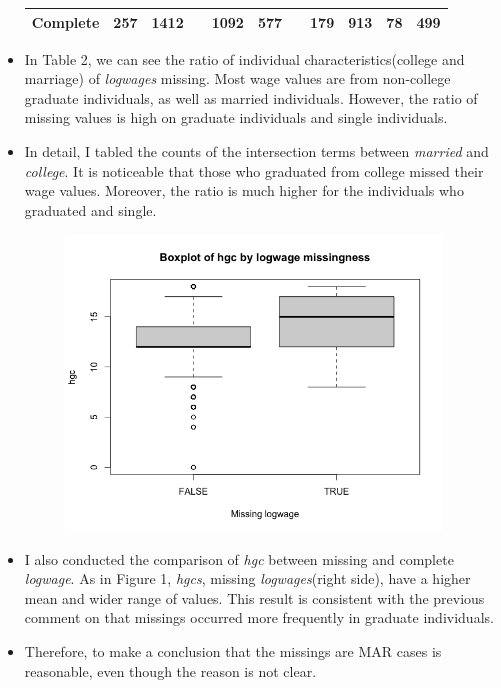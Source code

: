 \documentclass{article}
\begin{document}
\begin{itemize}
\begin{table}[h]
\begin{tabular}[t]{ccccccccccc}
				Complete & 257 & 1412 && 1092 & 577 &&179&913&78&499 \\\bottomrule
			\end{tabular}
		\end{table}
		\item In Table 2, we can see the ratio of individual characteristics(college and marriage) of \textit{logwages} missing. Most wage values are from non-college graduate individuals, as well as married individuals. However, the ratio of missing values is high on graduate individuals and single individuals.
		\item In detail, I tabled the counts of the intersection terms between \textit{married} and \textit{college}. It is noticeable that those who graduated from college missed their wage values. Moreover, the ratio is much higher for the individuals who graduated and single.
		\begin{figure}[h]
			\centering
			\caption{}
			\includegraphics[width = 100mm]{hgc_boxplot.png}
		\end{figure}
		\item I also conducted the comparison of \textit{hgc} between missing and complete \textit{logwage}. As in Figure 1, \textit{hgcs}, missing \textit{logwages}(right side), have a higher mean and wider range of values. This result is consistent with the previous comment on that missings occurred more frequently in graduate individuals. 
		\item Therefore, to make a conclusion that the missings are MAR cases is reasonable, even though the reason is not clear.
	\end{itemize}
\end{document}

